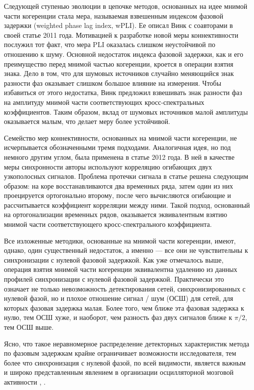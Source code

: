 Следующей ступенью эволюции в цепочке методов, основанных на идее мнимой части когеренции стала 
мера, называемая взвешенным индексом фазовой задержки (weighted phase lag index, wPLI). Ее описал Винк с 
соавторами в своей статье 2011 года. Мотивацией к разработке новой меры коннективности послужил тот 
факт, что мера PLI оказалась слишком неустойчивой по отношению к шуму. Основной недостаток индекса фазовой 
задержки, как и его преимущество перед мнимой частью когеренции, кроется в операции взятия знака.
Дело в том, что для шумовых источников случайно меняющийся знак разности фаз оказывает слишком большое 
влияние на измерения. Чтобы избавиться от этого недостатка, Винк предложил взвешивать знак разности фаз 
на амплитуду мнимой части соответствующих кросс-спектральных коэффициентов. Таким образом, вклад от шумовых 
источников малой амплитуды оказывается малым, что делает меру более устойчивой.

Семейство мер коннективности, основанных на мнимой части когеренции, не исчерпывается обозначенными 
тремя подходами. Аналогичная идея, но под немного другим углом, была применена в статье
 2012 года. В ней в качестве меры синхронности 
авторы используют корреляцию огибающих двух узкополосных сигналов. Проблема протечки сигнала 
в статье решена следующим образом: 
на коре восстанавливаются два временных ряда, затем один из них проецируется ортогонально второму, 
после чего вычисляются огибающие и рассчитывается коэффициент корреляции между ними.
Такой подход, основанный на ортогонализации временных рядов, оказывается эквивалентным взятию 
мнимой части  соответствующего кросс-спектрального коэффициента.



Все изложенные методики, основанные на мнимой части когеренции, имеют,
однако, один существенный недостаток, а именно --- все они не чувствительны к 
синхронизации с нулевой фазовой задержкой. Как уже отмечалось выше, операция 
взятия мнимой части когеренции эквивалентна удалению из данных профилей синхронизации 
с нулевой фазовой задержкой. Практически это означает не только невозможность детектирования 
сетей, синхронизированных с нулевой фазой, но и плохое отношение сигнал / шум (ОСШ) для
сетей, для которых фазовая задержка малая. Более того, чем ближе эта фазовая задержка к нулю, 
тем ОСШ хуже, и наоборот, чем разность фаз двух сигналов ближе к $\pi / 2$, тем ОСШ выше. 

Ясно, что такое неравномерное распределение детекторных характеристик метода по 
фазовым задержкам крайне ограничивает возможности исследователя, тем более что 
синхронизация с нулевой фазой, по всей видимости, является важным и широко представленным 
явлением в организации осцилляторной мозговой активности \cite{}, \cite{}.

